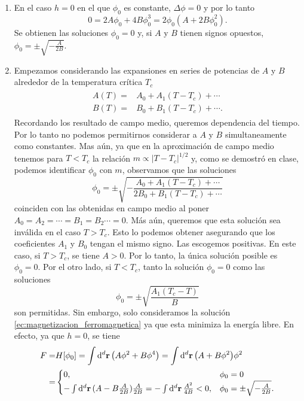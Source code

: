 \documentclass{article}
\begin{document}
\begin{enumerate}
\item En el caso $h=0$ en el que $\phi_0$ es constante, $\Delta\phi=0$ y por lo tanto
\begin{equation}
0=2A\phi_0+4B\phi_0^3=2\phi_0(A+2B\phi_0^2).
\end{equation}
Se obtienen las soluciones $\phi_0=0$ y, si $A$ y $B$ tienen signos opuestos, $\phi_0=\pm\sqrt{-\frac{A}{2B}}$.

\item Empezamos considerando las expansiones en series de potencias de $A$ y $B$ alrededor de la temperatura crítica $T_c$
\begin{align}
\begin{split}
A(T)=&A_0+A_1(T-T_c)+\cdots\\
B(T)=&B_0+B_1(T-T_c)+\cdots.
\end{split}
\end{align}
Recordando los resultado de campo medio, queremos dependencia del tiempo. Por lo tanto no podemos permitirnos considerar a $A$ y $B$ simultaneamente como constantes. Mas aún, ya que en la aproximación de campo medio tenemos para $T<T_c$ la relación $m\propto|T-T_c|^{1/2}$ y, como se demostró en clase, podemos identificar $\phi_0$ con $m$, observamos que las soluciones
\begin{equation}
\phi_0=\pm\sqrt{-\frac{A_0+A_1(T-T_c)+\cdots}{2B_0+B_1(T-T_c)+\cdots}}
\end{equation}
coinciden con las obtenidas en campo medio al poner $A_0=A_2=\cdots=B_1=B_2\cdots=0$. Más aún, queremos que esta solución sea inválida en el caso $T>T_c$. Esto lo podemos obtener asegurando que los coeficientes $A_1$ y $B_0$ tengan el mismo signo. Las escogemos positivas. En este caso, si $T>T_c$, se tiene $A>0$. Por lo tanto, la única solución posible es $\phi_0=0$. Por el otro lado, si $T<T_c$, tanto la solución $\phi_0=0$ como las soluciones 
\begin{equation}\label{ec:magnetizacion_ferromagnetica}
\phi_0=\pm\sqrt{\frac{A_1(T_c-T)}{B}}
\end{equation}
son permitidas. Sin embargo, solo consideramos la solución \eqref{ec:magnetizacion_ferromagnetica} ya que esta minimiza la energía libre. En efecto, ya que $h=0$, se tiene
\begin{align}
\begin{split}
F=&H[\phi_0]=\int\dd[d]{\vb{r}}\qty(A\phi^2+B\phi^4)=\int\dd[d]{\vb{r}}\qty(A+B\phi^2)\phi^2\\
=&\begin{cases}
0, & \phi_0=0\\
-\int\dd[d]{\vb{r}}(A-B\frac{A}{2B})\frac{A}{2B}=-\int\dd[d]{\vb{r}}\frac{A^2}{4B}<0, & \phi_0=\pm{\sqrt{-\frac{A}{2B}}}.
\end{cases}
\end{split}
\end{align} 

\end{enumerate}
\end{document}
